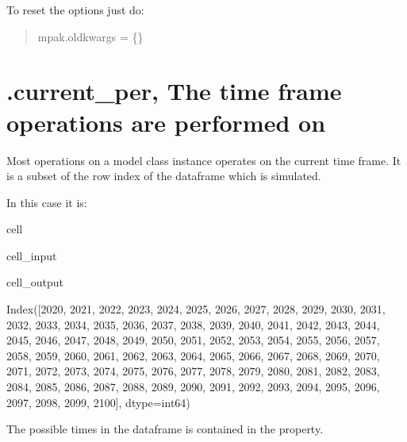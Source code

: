 \documentclass[letterpaper,10pt,english]{jupyterBook}
\begin{document}
\sphinxAtStartPar
To reset the options just do:
\begin{quote}

\sphinxAtStartPar
mpak.oldkwargs = \{\}
\end{quote}


\section{.current\_per, The time frame operations are performed on}
\label{\detokenize{content/notebooks/modelflow_features:current-per-the-time-frame-operations-are-performed-on}}
\sphinxAtStartPar
Most operations on a model class instance operates on the current time frame.
It is a subset of the row index of the dataframe which is simulated.

\sphinxAtStartPar
In this case it is:

\begin{sphinxuseclass}{cell}\begin{sphinxVerbatimInput}

\begin{sphinxuseclass}{cell_input}
\begin{sphinxVerbatim}[commandchars=\\\{\}]
\end{sphinxVerbatim}

\end{sphinxuseclass}\end{sphinxVerbatimInput}
\begin{sphinxVerbatimOutput}

\begin{sphinxuseclass}{cell_output}
\begin{sphinxVerbatim}[commandchars=\\\{\}]
Index([2020, 2021, 2022, 2023, 2024, 2025, 2026, 2027, 2028, 2029, 2030, 2031,
       2032, 2033, 2034, 2035, 2036, 2037, 2038, 2039, 2040, 2041, 2042, 2043,
       2044, 2045, 2046, 2047, 2048, 2049, 2050, 2051, 2052, 2053, 2054, 2055,
       2056, 2057, 2058, 2059, 2060, 2061, 2062, 2063, 2064, 2065, 2066, 2067,
       2068, 2069, 2070, 2071, 2072, 2073, 2074, 2075, 2076, 2077, 2078, 2079,
       2080, 2081, 2082, 2083, 2084, 2085, 2086, 2087, 2088, 2089, 2090, 2091,
       2092, 2093, 2094, 2095, 2096, 2097, 2098, 2099, 2100],
      dtype=\PYGZsq{}int64\PYGZsq{})
\end{sphinxVerbatim}

\end{sphinxuseclass}\end{sphinxVerbatimOutput}

\end{sphinxuseclass}
\sphinxAtStartPar
The possible times in the dataframe is contained in the  property.
\end{document}
